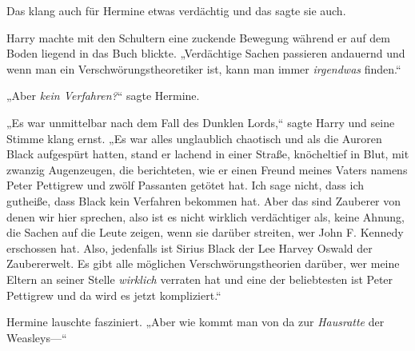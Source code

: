 {Das klang auch für Hermine etwas verdächtig und das sagte sie auch.

Harry machte mit den Schultern eine zuckende Bewegung während er auf dem Boden liegend in das Buch blickte. „Verdächtige Sachen passieren andauernd und wenn man ein Verschwörungstheoretiker ist, kann man immer \emph{irgendwas} finden.“

„Aber \emph{kein Verfahren?}“ sagte Hermine.

„Es war unmittelbar nach dem Fall des Dunklen Lords,“ sagte Harry und seine Stimme klang ernst. „Es war alles unglaublich chaotisch und als die Auroren Black aufgespürt hatten, stand er lachend in einer Straße, knöcheltief in Blut, mit zwanzig Augenzeugen, die berichteten, wie er einen Freund meines Vaters namens Peter Pettigrew und zwölf Passanten getötet hat. Ich sage nicht, dass ich gutheiße, dass Black kein Verfahren bekommen hat. Aber das sind Zauberer von denen wir hier sprechen, also ist es nicht wirklich verdächtiger als, keine Ahnung, die Sachen auf die Leute zeigen, wenn sie darüber streiten, wer John F. Kennedy erschossen hat. Also, jedenfalls ist Sirius Black der Lee Harvey Oswald der Zaubererwelt. Es gibt alle möglichen Verschwörungstheorien darüber, wer meine Eltern an seiner Stelle \emph{wirklich} verraten hat und eine der beliebtesten ist Peter Pettigrew und da wird es jetzt kompliziert.“

Hermine lauschte fasziniert. „Aber wie kommt man von da zur \emph{Hausratte} der Weasleys—“

}
